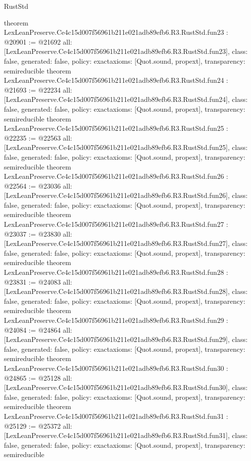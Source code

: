 \begin{lexlean}{RustStd}
\begin{coremodule}
{}
theorem LexLeanPreserve.Ce4c15d007f56961b211e021adb89efb6.R3.RustStd.fun23 : @20901 := @21692 {
  all: [LexLeanPreserve.Ce4c15d007f56961b211e021adb89efb6.R3.RustStd.fun23],
  class: false,
  generated: false,
  policy: exact{axioms: [Quot.sound, propext]},
  transparency: semireducible
}
theorem LexLeanPreserve.Ce4c15d007f56961b211e021adb89efb6.R3.RustStd.fun24 : @21693 := @22234 {
  all: [LexLeanPreserve.Ce4c15d007f56961b211e021adb89efb6.R3.RustStd.fun24],
  class: false,
  generated: false,
  policy: exact{axioms: [Quot.sound, propext]},
  transparency: semireducible
}
theorem LexLeanPreserve.Ce4c15d007f56961b211e021adb89efb6.R3.RustStd.fun25 : @22235 := @22563 {
  all: [LexLeanPreserve.Ce4c15d007f56961b211e021adb89efb6.R3.RustStd.fun25],
  class: false,
  generated: false,
  policy: exact{axioms: [Quot.sound, propext]},
  transparency: semireducible
}
theorem LexLeanPreserve.Ce4c15d007f56961b211e021adb89efb6.R3.RustStd.fun26 : @22564 := @23036 {
  all: [LexLeanPreserve.Ce4c15d007f56961b211e021adb89efb6.R3.RustStd.fun26],
  class: false,
  generated: false,
  policy: exact{axioms: [Quot.sound, propext]},
  transparency: semireducible
}
theorem LexLeanPreserve.Ce4c15d007f56961b211e021adb89efb6.R3.RustStd.fun27 : @23037 := @23830 {
  all: [LexLeanPreserve.Ce4c15d007f56961b211e021adb89efb6.R3.RustStd.fun27],
  class: false,
  generated: false,
  policy: exact{axioms: [Quot.sound, propext]},
  transparency: semireducible
}
theorem LexLeanPreserve.Ce4c15d007f56961b211e021adb89efb6.R3.RustStd.fun28 : @23831 := @24083 {
  all: [LexLeanPreserve.Ce4c15d007f56961b211e021adb89efb6.R3.RustStd.fun28],
  class: false,
  generated: false,
  policy: exact{axioms: [Quot.sound, propext]},
  transparency: semireducible
}
theorem LexLeanPreserve.Ce4c15d007f56961b211e021adb89efb6.R3.RustStd.fun29 : @24084 := @24864 {
  all: [LexLeanPreserve.Ce4c15d007f56961b211e021adb89efb6.R3.RustStd.fun29],
  class: false,
  generated: false,
  policy: exact{axioms: [Quot.sound, propext]},
  transparency: semireducible
}
theorem LexLeanPreserve.Ce4c15d007f56961b211e021adb89efb6.R3.RustStd.fun30 : @24865 := @25128 {
  all: [LexLeanPreserve.Ce4c15d007f56961b211e021adb89efb6.R3.RustStd.fun30],
  class: false,
  generated: false,
  policy: exact{axioms: [Quot.sound, propext]},
  transparency: semireducible
}
theorem LexLeanPreserve.Ce4c15d007f56961b211e021adb89efb6.R3.RustStd.fun31 : @25129 := @25372 {
  all: [LexLeanPreserve.Ce4c15d007f56961b211e021adb89efb6.R3.RustStd.fun31],
  class: false,
  generated: false,
  policy: exact{axioms: [Quot.sound, propext]},
  transparency: semireducible
}
\end{coremodule}
\end{lexlean}
